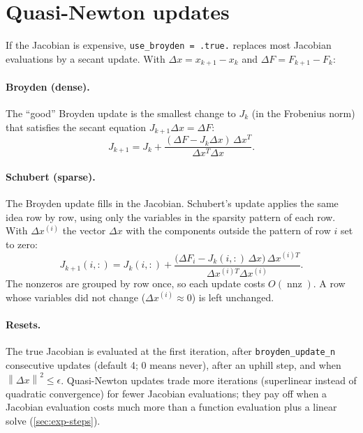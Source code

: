 \documentclass[11pt]{article}
\newcommand{\norm}[1]{\left\lVert #1 \right\rVert}
\newcommand{\code}[1]{\texttt{#1}}
\DeclareMathOperator{\nnz}{nnz}
\begin{document}
\section{Quasi-Newton updates}
\label{sec:broyden}

If the Jacobian is expensive, \code{use\_broyden = .true.} replaces most Jacobian evaluations by a
secant update. With $\Delta x = x_{k+1} - x_k$ and $\Delta F = F_{k+1} - F_k$:

\paragraph{Broyden (dense).} The ``good'' Broyden update \cite{broyden} is the smallest change to
$J_k$ (in the Frobenius norm) that satisfies the secant equation $J_{k+1} \Delta x = \Delta F$:
\begin{equation}
  J_{k+1} = J_k + \frac{(\Delta F - J_k \Delta x)\, \Delta x^T}{\Delta x^T \Delta x} .
\end{equation}

\paragraph{Schubert (sparse).} The Broyden update fills in the Jacobian. Schubert's update
\cite{schubert} applies the same idea row by row, using only the variables in the sparsity pattern
of each row. With $\Delta x^{(i)}$ the vector $\Delta x$ with the components outside the pattern of
row $i$ set to zero:
\begin{equation}
  J_{k+1}(i,:) = J_k(i,:) + \frac{\big(\Delta F_i - J_k(i,:)\, \Delta x\big)\, \Delta x^{(i)T}}{\Delta x^{(i)T} \Delta x^{(i)}} .
\end{equation}
The nonzeros are grouped by row once, so each update costs $O(\nnz)$. A row whose variables did not
change ($\Delta x^{(i)} \approx 0$) is left unchanged.

\paragraph{Resets.} The true Jacobian is evaluated at the first iteration, after
\code{broyden\_update\_n} consecutive updates (default 4; 0 means never), after an uphill step, and when
$\norm{\Delta x}^2 \le \epsilon$. Quasi-Newton updates trade more iterations (superlinear instead of
quadratic convergence) for fewer Jacobian evaluations; they pay off when a Jacobian evaluation costs
much more than a function evaluation plus a linear solve (\cref{sec:exp-steps}).
\end{document}
